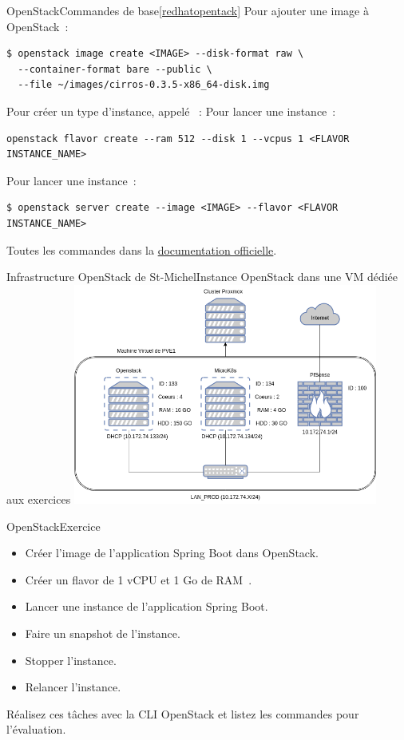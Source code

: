 \documentclass{beamer}
\begin{document}
    \begin{frame}[fragile]{OpenStack}{Commandes de base\cref{redhatopentack}}
        Pour ajouter une image à OpenStack~:
        \begin{lstlisting}
$ openstack image create <IMAGE> --disk-format raw \
  --container-format bare --public \
  --file ~/images/cirros-0.3.5-x86_64-disk.img
        \end{lstlisting}
        Pour créer un type d'instance, appelé ~:
        Pour lancer une instance~:
        \begin{lstlisting}
openstack flavor create --ram 512 --disk 1 --vcpus 1 <FLAVOR INSTANCE_NAME>
        \end{lstlisting}
        Pour lancer une instance~:
        \begin{lstlisting}
$ openstack server create --image <IMAGE> --flavor <FLAVOR INSTANCE_NAME>
        \end{lstlisting}
        \bigbreak
        Toutes les commandes dans la \href{https://docs.OpenStack.org/ocata/user-guide/cli-cheat-sheet.html}{documentation officielle}.
    \end{frame}
    \begin{frame}{Infrastructure OpenStack de St-Michel}{Instance OpenStack dans une VM dédiée aux exercices}
        \bigbreak
        \centering
        \includegraphics[width=10cm]{image/infra.drawio}
    \end{frame}
    \begin{frame}{OpenStack}{Exercice \execcounterdispinc{}}
        \begin{itemize}
            \item Créer l'image de l'application Spring Boot dans OpenStack.
            \item Créer un flavor de 1 vCPU et 1 Go de RAM~.
            \item Lancer une instance de l'application Spring Boot.
            \item Faire un snapshot de l'instance.
            \item Stopper l'instance.
            \item Relancer l'instance.
        \end{itemize}
        Réalisez ces tâches avec la CLI OpenStack et listez les commandes pour l'évaluation.
    \end{frame}
\end{document}
